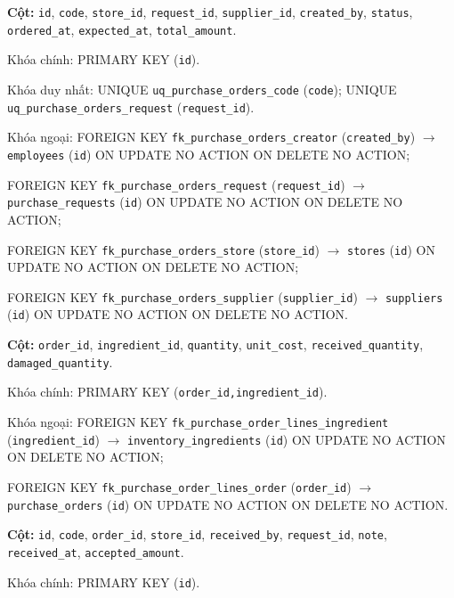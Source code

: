 \begin{description}[leftmargin=3.6cm,labelwidth=3.4cm,style=nextline]
\item[\texttt{purchase\_orders}] \textbf{Cột:} \texttt{id}, \texttt{code}, \texttt{store\_id}, \texttt{request\_id}, \texttt{supplier\_id}, \texttt{created\_by}, \texttt{status}, \texttt{ordered\_at}, \texttt{expected\_at}, \texttt{total\_amount}.

Khóa chính: PRIMARY KEY (\texttt{id}).

Khóa duy nhất: UNIQUE \texttt{uq\_purchase\_orders\_code} (\texttt{code}); UNIQUE \texttt{uq\_purchase\_orders\_request} (\texttt{request\_id}).

Khóa ngoại: FOREIGN KEY \texttt{fk\_purchase\_orders\_creator} (\texttt{created\_by}) $\rightarrow$ \texttt{employees} (\texttt{id}) ON UPDATE NO ACTION ON DELETE NO ACTION;\par FOREIGN KEY \texttt{fk\_purchase\_orders\_request} (\texttt{request\_id}) $\rightarrow$ \texttt{purchase\_requests} (\texttt{id}) ON UPDATE NO ACTION ON DELETE NO ACTION;\par FOREIGN KEY \texttt{fk\_purchase\_orders\_store} (\texttt{store\_id}) $\rightarrow$ \texttt{stores} (\texttt{id}) ON UPDATE NO ACTION ON DELETE NO ACTION;\par FOREIGN KEY \texttt{fk\_purchase\_orders\_supplier} (\texttt{supplier\_id}) $\rightarrow$ \texttt{suppliers} (\texttt{id}) ON UPDATE NO ACTION ON DELETE NO ACTION.

\item[\texttt{purchase\_order\_lines}] \textbf{Cột:} \texttt{order\_id}, \texttt{ingredient\_id}, \texttt{quantity}, \texttt{unit\_cost}, \texttt{received\_quantity}, \texttt{damaged\_quantity}.

Khóa chính: PRIMARY KEY (\texttt{order\_id,ingredient\_id}).

Khóa ngoại: FOREIGN KEY \texttt{fk\_purchase\_order\_lines\_ingredient} (\texttt{ingredient\_id}) $\rightarrow$ \texttt{inventory\_ingredients} (\texttt{id}) ON UPDATE NO ACTION ON DELETE NO ACTION;\par FOREIGN KEY \texttt{fk\_purchase\_order\_lines\_order} (\texttt{order\_id}) $\rightarrow$ \texttt{purchase\_orders} (\texttt{id}) ON UPDATE NO ACTION ON DELETE NO ACTION.

\item[\texttt{goods\_receipts}] \textbf{Cột:} \texttt{id}, \texttt{code}, \texttt{order\_id}, \texttt{store\_id}, \texttt{received\_by}, \texttt{request\_id}, \texttt{note}, \texttt{received\_at}, \texttt{accepted\_amount}.

Khóa chính: PRIMARY KEY (\texttt{id}).


\end{description}
